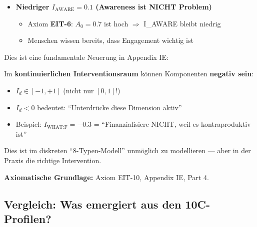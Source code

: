 \begin{itemize}[nosep]
\item \textbf{Niedriger $I_{\text{AWARE}} = 0.1$ (Awareness ist NICHT Problem)}
  \begin{itemize}[nosep]
  \item Axiom \textbf{EIT-6}: $A_0 = 0.7$ ist hoch $\Rightarrow$ I_AWARE bleibt niedrig
  \item Menschen wissen bereits, dass Engagement wichtig ist
  \end{itemize}
\end{itemize}

\begin{tcolorbox}[colback=red!5!white, colframe=red!75!black,
    title=\textbf{DURCHBRUCH: Negative Interventionskomponenten (EIT-10)}]

Dies ist eine fundamentale Neuerung in Appendix IE:

Im \textbf{kontinuierlichen Interventionsraum} können Komponenten \textbf{negativ sein}:
\begin{itemize}[nosep]
\item $I_d \in [-1, +1]$ (nicht nur $[0, 1]$!)
\item $I_d < 0$ bedeutet: ``Unterdrücke diese Dimension aktiv''
\item Beispiel: $I_{\text{WHAT:F}} = -0.3$ = ``Finanzialisiere NICHT, weil es kontraproduktiv ist''
\end{itemize}

Dies ist im diskreten ``8-Typen-Modell'' unmöglich zu modellieren — aber in der Praxis die richtige Intervention.

\textbf{Axiomatische Grundlage:} Axiom EIT-10, Appendix IE, Part 4.

\end{tcolorbox}

\subsection{Vergleich: Was emergiert aus den 10C-Profilen?}
\label{sec:17-comparison}

